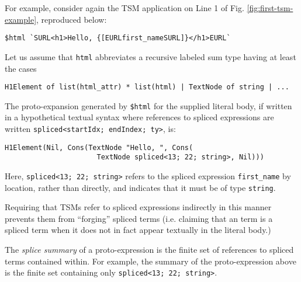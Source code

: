 \documentclass[acmlarge,review,anonymous]{acmart}\settopmatter{printfolios=true}
\newcommand{\li}[1]{\lstinline{#1}}
\begin{document}
For example, consider again the TSM application on Line 1 of Fig. \ref{fig:first-tsm-example}, reproduced below:
\begin{lstlisting}[numbers=none]
  $html `SURL<h1>Hello, {[EURLfirst_nameSURL]}</h1>EURL`
\end{lstlisting}
Let us assume that \li{html} abbreviates a recursive labeled sum type having at least the cases
\begin{lstlisting}[numbers=none]
  H1Element of list(html_attr) * list(html) | TextNode of string | ...
\end{lstlisting}
The proto-expansion generated by \li{$html} for the supplied literal body, if written in a hypothetical textual syntax where references to spliced expressions are written \li{spliced<startIdx; endIndex; ty>}, is:
\begin{lstlisting}[numbers=none]
  H1Element(Nil, Cons(TextNode "Hello, ", Cons(
                      TextNode spliced<13; 22; string>, Nil)))
\end{lstlisting}
Here, \li{spliced<13; 22; string>} refers to the spliced expression \li{first_name} by location, rather than directly, and indicates that it must be of type \li{string}.

Requiring that TSMs refer to spliced expressions indirectly in this manner prevents them from ``forging'' spliced terms (i.e. claiming that an term is a spliced term when it does not in fact appear textually in the literal body.)%





The \emph{splice summary} of a proto-expression is the finite set of references to spliced terms contained within. For example, the summary of the proto-expression above is the finite set containing only \li{spliced<13; 22; string>}.%
\end{document}

